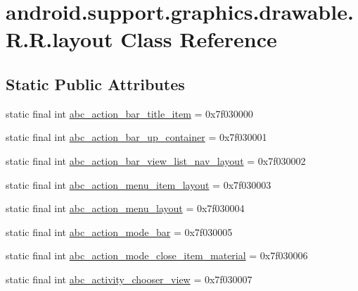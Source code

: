\hypertarget{classandroid_1_1support_1_1graphics_1_1drawable_1_1_r_1_1layout}{
\section{android.support.graphics.drawable.R.R.layout Class Reference}
\label{classandroid_1_1support_1_1graphics_1_1drawable_1_1_r_1_1layout}
}
\subsection*{Static Public Attributes}
\begin{CompactItemize}
\item 
static final int \hyperlink{classandroid_1_1support_1_1graphics_1_1drawable_1_1_r_1_1layout_5c6599877e40752969a6f444e1f83ab2}{abc\_\-action\_\-bar\_\-title\_\-item} = 0x7f030000
\item 
static final int \hyperlink{classandroid_1_1support_1_1graphics_1_1drawable_1_1_r_1_1layout_600ef419d16cc04f85e4f5b26b05482a}{abc\_\-action\_\-bar\_\-up\_\-container} = 0x7f030001
\item 
static final int \hyperlink{classandroid_1_1support_1_1graphics_1_1drawable_1_1_r_1_1layout_5365ef64836d204f746d8fd2559a08f3}{abc\_\-action\_\-bar\_\-view\_\-list\_\-nav\_\-layout} = 0x7f030002
\item 
static final int \hyperlink{classandroid_1_1support_1_1graphics_1_1drawable_1_1_r_1_1layout_16f7d43ac2ae8c19f8b20e0bd2d6c518}{abc\_\-action\_\-menu\_\-item\_\-layout} = 0x7f030003
\item 
static final int \hyperlink{classandroid_1_1support_1_1graphics_1_1drawable_1_1_r_1_1layout_64882bfa5954addab55df0d39ae54197}{abc\_\-action\_\-menu\_\-layout} = 0x7f030004
\item 
static final int \hyperlink{classandroid_1_1support_1_1graphics_1_1drawable_1_1_r_1_1layout_32e6002c3293f73602afcd13a877e5ff}{abc\_\-action\_\-mode\_\-bar} = 0x7f030005
\item 
static final int \hyperlink{classandroid_1_1support_1_1graphics_1_1drawable_1_1_r_1_1layout_e50d0d28478184164c40f0549c4cc55e}{abc\_\-action\_\-mode\_\-close\_\-item\_\-material} = 0x7f030006
\item 
static final int \hyperlink{classandroid_1_1support_1_1graphics_1_1drawable_1_1_r_1_1layout_aef8bd3d237c34dce50e2e938fb56554}{abc\_\-activity\_\-chooser\_\-view} = 0x7f030007
\item 

\end{CompactItemize}
